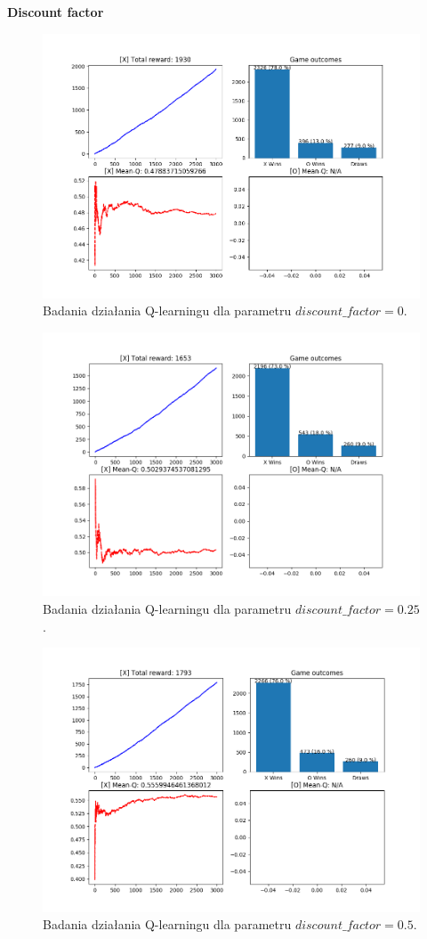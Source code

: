 \pagebreak

\textbf{Discount factor}
\begin{figure}[H]
	\centering
	\includegraphics[width=0.7\linewidth]{imgs/q_learning/analysis/batch/df/df_0}
	\caption{Badania działania Q-learningu dla parametru $discount\_factor = 0$.}
\end{figure}

\begin{figure}[H]
	\centering
	\includegraphics[width=0.7\linewidth]{imgs/q_learning/analysis/batch/df/df_025}
	\caption{Badania działania Q-learningu dla parametru $discount\_factor = 0.25$.}
\end{figure}

\begin{figure}[H]
	\centering
	\includegraphics[width=0.7\linewidth]{imgs/q_learning/analysis/batch/df/df_05}
	\caption{Badania działania Q-learningu dla parametru $discount\_factor = 0.5$.}
\end{figure}

